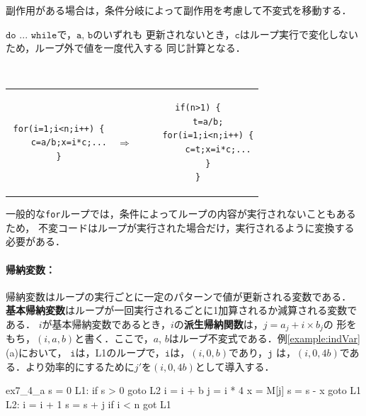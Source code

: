 \documentclass[dvipdfmx,a4j]{jbook}
\begin{document}
\vspace*{10pt}

副作用がある場合は，条件分岐によって副作用を考慮して不変式を移動する．

$\texttt{do}$ ... $\texttt{while}$で，$\texttt{a}$, $\texttt{b}$のいずれも
更新されないとき，$\texttt{c}$はループ実行で変化しないため，ループ外で値を一度代入する
同じ計算となる．

\begin{Exmp}\ 
\begin{center}
    \begin{tabular}{ccc}
\begin{minipage}{.3\linewidth}
\begin{Verbatim}
for(i=1;i<n;i++) {
    c=a/b;x=i*c;...
}
\end{Verbatim}
\end{minipage}
& $\Rightarrow$ &
\begin{minipage}{.3\linewidth}
\begin{Verbatim}
if(n>1) {
    t=a/b;
    for(i=1;i<n;i++) {
        c=t;x=i*c;...
    }
}
\end{Verbatim}
\end{minipage}
\end{tabular}
\end{center}
\end{Exmp}

一般的な{\tt for}ループでは，条件によってループの内容が実行されないこともあるため，
不変コードはループが実行された場合だけ，実行されるように変換する必要がある．

\paragraph{帰納変数：}
帰納変数はループの実行ごとに一定のパターンで値が更新される変数である．
{\bf 基本帰納変数}はループが一回実行されるごとに1加算されるか減算される変数である．
$i$が基本帰納変数であるとき，$i$の{\bf 派生帰納関数}は，$j=a_j+i\times b_j$の
形をもち，$(i,a,b)$と書く．ここで，$a$, $b$はループ不変式である．例\ref{example:indVar}(a)において，
$\texttt{i}$は，L1のループで，$\texttt{i}$は，$(i,0,b)$であり，$\texttt{j}$
は，$(i,0,4b)$である．より効率的にするために$j'$を$(i,0,4b)$として導入する．


\begin{SaveVerbatim}{ex7_4_a}
    s = 0
L1: if s > 0 goto L2
    i = i + b
    j = i * 4
    x = M[j]
    s = s - x
    goto L1
L2: i = i + 1
    s = s + j
    if i < n got L1
\end{SaveVerbatim}
\end{document}
